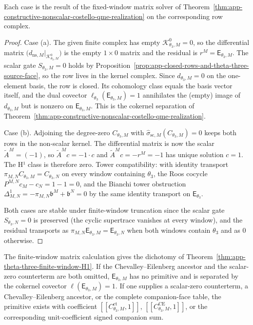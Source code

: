 \begin{thm}
  Each case is the result of the fixed-window matrix solver of
  Theorem~\ref{thm:app-constructive-nonscalar-costello-qme-realization}
  on the corresponding row complex.
\end{thm}

\begin{proof}
  Case (a).  The given finite complex has empty
  \(\mathcal K^0_{\theta_3,M}=0\), so the differential matrix
  \(\bigl(d_{\mathrm{ns},M}\big|_{\mathcal K^0_{\theta_3,M}}\bigr)\)
  is the empty \(1\times0\) matrix and the residual is
  \(r^M=\mathsf E_{\theta_3,M}\).  The scalar gate
  \(S_{\theta_3,M}=0\) holds by
  Proposition~\ref{prop:app-closed-rows-and-theta-three-source-face},
  so the row lives in the kernel complex.  Since
  \(d_{\theta_3,M}=0\) on the one-element basis, the row is closed.
  Its cohomology class equals the basis vector itself, and the dual
  covector \(\ell_{\theta_3}(\mathsf E_{\theta_3,M})=1\) annihilates
  the (empty) image of \(d_{\theta_3,M}\) but is nonzero on
  \(\mathsf E_{\theta_3,M}\).  This is the cokernel separation of
  Theorem~\ref{thm:app-constructive-nonscalar-costello-qme-realization}.

  Case (b).  Adjoining the degree-zero \(C_{\theta_3,M}\) with
  \(\widehat\sigma_{\mathrm{sc},M}(C_{\theta_3,M})=0\) keeps both rows
  in the non-scalar kernel.  The differential matrix is now the
  scalar \(\widetilde A^M=(-1)\), so
  \(\widetilde A^M c=-1\cdot c\) and \(\widetilde A^M c=-r^M=-1\)
  has unique solution \(c=1\).  The H¹ class is therefore zero.
  Tower compatibility: with identity transport
  \(\pi_{M,N}C_{\theta_3,M}=C_{\theta_3,N}\) on every window
  containing \(\theta_3\), the Roos cocycle
  \(P^{M,N}c_M-c_N=1-1=0\), and the Bianchi tower obstruction
  \(\Delta^1_{M,N}=-\pi_{M,N}\mathfrak b^M+\mathfrak b^N=0\) by the
  same identity transport on \(\mathsf E_{\theta_3}\).

  Both cases are stable under finite-window truncation since the
  scalar gate \(S_{\theta_3,N}=0\) is preserved (the cyclic supertrace
  vanishes at every window), and the residual transports as
  \(\pi_{M,N}\mathsf E_{\theta_3,M}=\mathsf E_{\theta_3,N}\) when both
  windows contain \(\theta_3\) and as \(0\) otherwise.
\end{proof}

\begin{rmk}
\label{rmk:app-theta-three-finite-window-verification}
  The finite-window matrix calculation gives the dichotomy of
  Theorem~\ref{thm:app-theta-three-finite-window-H1}.  If the
  Chevalley--Eilenberg ancestor and the scalar-zero counterterm are
  both omitted, \(\mathsf E_{\theta_3,M}\) has no primitive and is
  separated by the cokernel covector
  \(\ell(\mathsf E_{\theta_3,M})=1\).  If one supplies a scalar-zero
  counterterm, a Chevalley--Eilenberg ancestor, or the complete
  companion-face table, the primitive exists with coefficient
  \([\![C_{\theta_3,M}^{\mathrm{ct}},1]\!]\),
  \([\![C_{\theta_3,M}^{\mathrm{CE}},1]\!]\), or the corresponding
  unit-coefficient signed companion sum.
\end{rmk}

